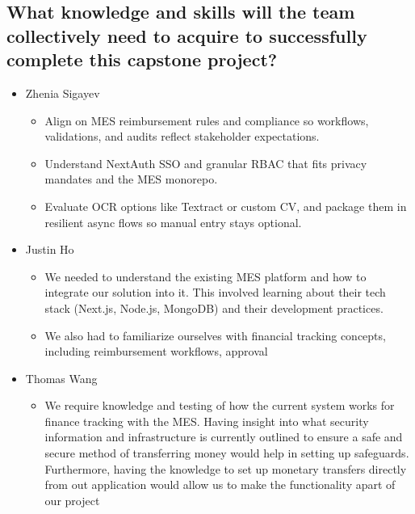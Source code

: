 \documentclass[12pt]{article}
\begin{document}
\begin{enumerate}
  \subsection{What knowledge and skills will the team collectively need to acquire to
    successfully complete this capstone project?}
  \begin{itemize}
    \item Zhenia Sigayev
      \begin{itemize}[label=$\circ$]
        \item Align on MES reimbursement rules and compliance so workflows, validations, and audits reflect stakeholder expectations.
        \item Understand NextAuth SSO and granular RBAC that fits privacy mandates and the MES monorepo.
        \item Evaluate OCR options like Textract or custom CV, and package them in resilient async flows so manual entry stays optional.
      \end{itemize}
    \item Justin Ho
      \begin{itemize}[label=$\circ$]
        \item We needed to understand the existing MES platform and how to integrate our solution into it. This involved learning about their tech stack (Next.js, Node.js, MongoDB) and their development practices.
        \item We also had to familiarize ourselves with financial tracking concepts, including reimbursement workflows, approval
      \end{itemize}
    \item Thomas Wang
      \begin{itemize}[label=$\circ$]
        \item We require knowledge and testing of how the current system works for finance tracking with the MES. Having insight into what security information and infrastructure is currently outlined to ensure a safe and secure method of transferring money would help in setting up safeguards. Furthermore, having the knowledge to set up monetary transfers directly from out application would allow us to make the functionality apart of our project
      \end{itemize}

\end{itemize}
\end{enumerate}
\end{document}
